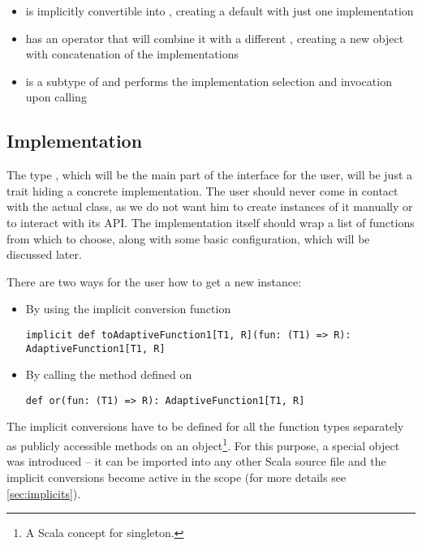 \begin{itemize}
	\item {} is implicitly convertible into , creating a default with just one implementation
	\item {} has an operator  that will combine it with a different , creating a new object with concatenation of the implementations
	\item {} is a subtype of  and performs the implementation selection and invocation upon calling 
\end{itemize}

\subsection{Implementation}
\label{subsec:api_implementation}

The type , which will be the main part of the interface for the user, will be just a trait hiding a concrete implementation. The user should never come in contact with the actual class, as we do not want him to create instances of it manually or to interact with its API. The implementation itself should wrap a list of functions from which to choose, along with some basic configuration, which will be discussed later.

There are two ways for the user how to get a new  instance:

\begin{itemize}
	\item By using the implicit conversion function
	\lstset{style=Scala}
	\begin{lstlisting}
implicit def toAdaptiveFunction1[T1, R](fun: (T1) => R): AdaptiveFunction1[T1, R]
\end{lstlisting}
	\item By calling the  method defined on 
		\lstset{style=Scala}
	\begin{lstlisting}
def or(fun: (T1) => R): AdaptiveFunction1[T1, R]
	\end{lstlisting}
\end{itemize}

The implicit conversions have to be defined for all the function types separately as publicly accessible methods on an object\footnote{A Scala concept for singleton.}. For this purpose, a special object  was introduced -- it can be imported into any other Scala source file and the implicit conversions become active in the scope (for more details see \ref{sec:implicits}).

